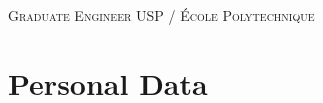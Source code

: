 \documentclass[a4paper,10pt]{article}
\begin{document}
\pagestyle{empty} %

\par{ \\ \normalsize \textsc{Graduate Engineer USP / École Polytechnique}
\medskip\par} %

\section{Personal Data}

\vspace*{5pt}
\hspace*{0pt}

\end{document}
